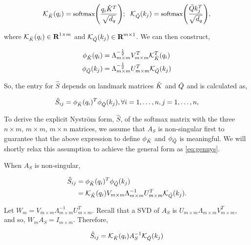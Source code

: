 \begin{align*}
\small
    \mathcal{K}_{\Tilde{K}}(q_i) = \text{softmax}{\left( \frac{q_i\Tilde{K}^T}{\sqrt{d_q}}\right)}; ~~
\mathcal{K}_{\Tilde{Q}}(k_j) = \text{softmax}{\left(\frac{\Tilde{Q}k_j^T}{\sqrt{d_q}}\right)},
\end{align*}

where $ \mathcal{K}_{\Tilde{K}}(q_i) \in \textbf{R}^{1 \times m}$ and $\mathcal{K}_{\Tilde{Q}}(k_j) \in \textbf{R}^{m \times 1}$. We can then construct,

\begin{align*}
\small
\phi_{\Tilde{K}}(q_i) & = \Lambda^{-\frac{1}{2}}_{m\times m} V_{m \times m}^T \mathcal{K}^T_{\Tilde{K}}(q_i) \\ \phi_{\Tilde{Q}}(k_j) & = \Lambda_{m\times m}^{-\frac{1}{2}}U_{m\times m}^T\mathcal{K}_{\Tilde{Q}}(k_j) 
\end{align*}

So, the entry for $\hat{S}$ depends on landmark matrices $\Tilde{K}$ and $\Tilde{Q}$ and is calculated as,

\begin{align}
\small
    \hat{S}_{ij} = \phi_{\Tilde{K}}(q_i)^T\phi_{\Tilde{Q}}(k_j), \forall i = 1, \dots, n, j = 1, \dots, n,
\end{align}

To derive the explicit Nystr\"{o}m form, $\hat{S}$, of the softmax matrix with the three $n\times m$, $m\times m$, $m \times n$ matrices, we assume that $A_S$ is non-singular first to guarantee that the above expression to define $\phi_{\Tilde{K}}$ and $\phi_{\Tilde{Q}}$ is meaningful. We will shortly relax this assumption to achieve the general form as \eqref{eq:gennys}.

When $A_S$ is non-singular,

\begin{align}\label{eq:shat}
\small
\hat{S}_{ij} &= \phi_{\Tilde{K}}(q_i)^T \phi_{\Tilde{Q}}(k_j)\\
    &= \mathcal{K}_{\Tilde{K}}(q_i)V_{m\times m}\Lambda_{m\times m}^{-1}U^T_{m \times m} \mathcal{K}_{\Tilde{Q}}(k_j).
\end{align}

Let $W_m  = V_{m\times m}\Lambda^{-1}_{m\times m}U_{m \times m}^T$. Recall that a SVD of $A_S$ is $U_{m \times m} \Lambda_{m\times m} V_{m \times m}^T$, and so, $W_mA_S = I_{m\times m}$. Therefore,

\begin{align}\label{eq:sij}
\small
    \hat{S}_{ij} = \mathcal{K}_{\Tilde{K}}(q_i)A_S^{-1} \mathcal{K}_{\Tilde{Q}}(k_j)
\end{align}

